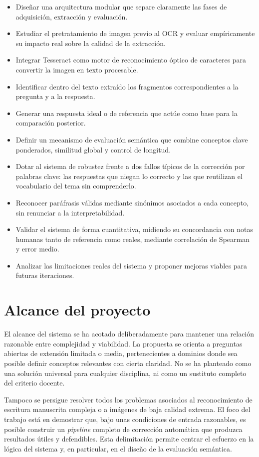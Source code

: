 \begin{itemize}[leftmargin=1.4em]
  \item Diseñar una arquitectura modular que separe claramente las fases de adquisición, extracción y evaluación.
  \item Estudiar el pretratamiento de imagen previo al OCR y evaluar empíricamente su impacto real sobre la calidad de la extracción.
  \item Integrar Tesseract como motor de reconocimiento óptico de caracteres para convertir la imagen en texto procesable.
  \item Identificar dentro del texto extraído los fragmentos correspondientes a la pregunta y a la respuesta.
  \item Generar una respuesta ideal o de referencia que actúe como base para la comparación posterior.
  \item Definir un mecanismo de evaluación semántica que combine conceptos clave ponderados, similitud global y control de longitud.
  \item Dotar al sistema de robustez frente a dos fallos típicos de la corrección por palabras clave: las respuestas que niegan lo correcto y las que reutilizan el vocabulario del tema sin comprenderlo.
  \item Reconocer paráfrasis válidas mediante sinónimos asociados a cada concepto, sin renunciar a la interpretabilidad.
  \item Validar el sistema de forma cuantitativa, midiendo su concordancia con notas humanas tanto de referencia como reales, mediante correlación de Spearman y error medio.
  \item Analizar las limitaciones reales del sistema y proponer mejoras viables para futuras iteraciones.
\end{itemize}

\section{Alcance del proyecto}

El alcance del sistema se ha acotado deliberadamente para mantener una relación razonable entre complejidad y viabilidad. La propuesta se orienta a preguntas abiertas de extensión limitada o media, pertenecientes a dominios donde sea posible definir conceptos relevantes con cierta claridad. No se ha planteado como una solución universal para cualquier disciplina, ni como un sustituto completo del criterio docente.

Tampoco se persigue resolver todos los problemas asociados al reconocimiento de escritura manuscrita compleja o a imágenes de baja calidad extrema. El foco del trabajo está en demostrar que, bajo unas condiciones de entrada razonables, es posible construir un \emph{pipeline} completo de corrección automática que produzca resultados útiles y defendibles. Esta delimitación permite centrar el esfuerzo en la lógica del sistema y, en particular, en el diseño de la evaluación semántica.

